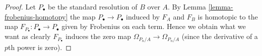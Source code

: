 \documentclass[10pt,a4paper]{amsart}
\theoremstyle{plain}
\theoremstyle{definition}
\theoremstyle{remark}
\numberwithin{equation}{subsection}
\begin{document}
\begin{proof}
Let $P_\bullet$ be the standard resolution of $B$ over $A$.
By Lemma \ref{lemma-frobenius-homotopy} the map $P_\bullet \to P_\bullet$
induced by $F_A$ and $F_B$ is homotopic to the map
$F_{P_\bullet} : P_\bullet \to P_\bullet$ given by
Frobenius on each term. Hence we obtain what we want as clearly
$F_{P_\bullet}$ induces the zero map $\Omega_{P_n/A} \to \Omega_{P_n/A}$
(since the derivative of a $p$th power is zero).
\end{proof}
\end{document}
